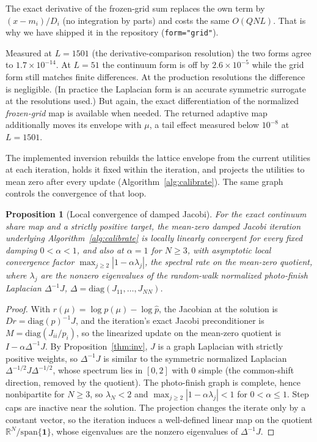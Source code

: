 \documentclass[12pt]{article}
\newtheorem{proposition}{Proposition}
\theoremstyle{remark}
\begin{document}
The exact derivative of the frozen-grid sum replaces the own term by
$(x - m_i)/D_i$ (no integration by parts) and costs the same $O(QNL)$. That is why we have shipped it in the repository
(\texttt{form="grid"}).

Measured at $L = 1501$ (the derivative-comparison resolution) the
two forms agree to $1.7\times10^{-14}$. At $L = 51$ the continuum form is
off by $2.6\times10^{-5}$ while the grid form still matches finite
differences. At the production resolutions the difference is
negligible. (In practice the Laplacian form is an accurate symmetric surrogate at
the resolutions used.) But again, the exact differentiation of the normalized
\emph{frozen-grid} map is available when needed.  The returned adaptive map
additionally moves its envelope with $\mu$, a tail effect measured below
$10^{-8}$ at $L = 1501$.

The implemented inversion rebuilds the lattice envelope from the current
utilities at each iteration, holds it fixed within the iteration, and
projects the utilities to mean zero after every update
(Algorithm~\ref{alg:calibrate}). The same graph controls the
convergence of that loop.

\begin{proposition}[Local convergence of damped Jacobi]
\label{prop:jacobi}
For the exact continuum share map and a strictly positive target, the
mean-zero damped Jacobi iteration underlying
Algorithm~\ref{alg:calibrate} is locally linearly convergent for every
fixed damping $0 < \alpha < 1$, and also at $\alpha = 1$ for $N \ge 3$,
with asymptotic local convergence factor
$\max_{j \ge 2} |1 - \alpha \lambda_j|$, the spectral rate on the
mean-zero quotient,
where $\lambda_j$ are the nonzero eigenvalues of the random-walk
normalized photo-finish Laplacian $\Delta^{-1} J$,
$\Delta = \mathrm{diag}(J_{11}, \dots, J_{NN})$.
\end{proposition}

\begin{proof}
With $r(\mu) = \log p(\mu) - \log \hat p$, the Jacobian at the
solution is $Dr = \mathrm{diag}(p)^{-1} J$, and the iteration's exact
Jacobi preconditioner is $M = \mathrm{diag}(J_{ii}/p_i)$, so the
linearized update on the mean-zero quotient is $I - \alpha
\Delta^{-1} J$. By Proposition~\ref{thm:inv}, $J$ is a graph Laplacian
with strictly positive weights, so $\Delta^{-1} J$ is similar to the
symmetric normalized Laplacian $\Delta^{-1/2} J \Delta^{-1/2}$, whose
spectrum lies in $[0, 2]$ with $0$ simple (the common-shift direction,
removed by the quotient). The photo-finish graph is complete, hence
nonbipartite for $N \ge 3$, so $\lambda_N < 2$ and $\max_{j\ge2} |1 -
\alpha \lambda_j| < 1$ for $0 < \alpha \le 1$. Step caps are inactive
near the solution. The projection changes the iterate only by a
constant vector, so the iteration induces a well-defined linear map on
the quotient $\mathbb{R}^N/\mathrm{span}\{\mathbf{1}\}$, whose
eigenvalues are the nonzero eigenvalues of $\Delta^{-1}J$.
\end{proof}
\end{document}
